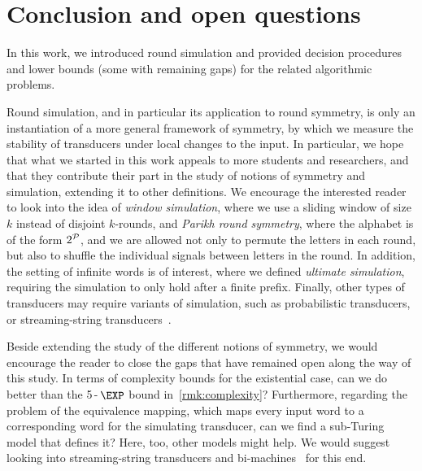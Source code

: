 \chapter{Conclusion and open questions}
\label{chap:conclusion}
\label{chap:discussion}
\label{chap:future}

In this work, we introduced round simulation and provided decision procedures and lower bounds (some with remaining gaps) for the related algorithmic problems.

Round simulation, and in particular its application to round symmetry, is only an instantiation of a more general framework of symmetry, by which we measure the stability of transducers under local changes to the input. In particular, we hope that what we started in this work appeals to more students and researchers, and that they contribute their part in the study of notions of symmetry and simulation, extending it to other definitions. We encourage the interested reader to look into the idea of \emph{window simulation}, where we use a sliding window of size $k$ instead of disjoint $k$-rounds, and \emph{Parikh round symmetry}, where the alphabet is of the form $2^{\mathcal{P}}$, and we are allowed not only to permute the letters in each round, but also to shuffle the individual signals between letters in the round. 
In addition, the setting of infinite words is of interest, where we defined \emph{ultimate simulation}, requiring the simulation to only hold after a finite prefix.
Finally, other types of transducers may require variants of simulation, such as probabilistic transducers, or streaming-string transducers~\cite{Alur2010}.

Beside extending the study of the different notions of symmetry, we would encourage the reader to close the gaps that have remained open along the way of this study. In terms of complexity bounds for the existential case, can we do better than the 5\,-\,$\EXP$ bound in~\cref{rmk:complexity}?
Furthermore, regarding the problem of the equivalence mapping, which maps every input word to a corresponding word for the simulating transducer, can we find a sub-Turing model that defines it? Here, too, other models might help. We would suggest looking into streaming-string transducers and bi-machines~\cite{Muscholl} for this end.

